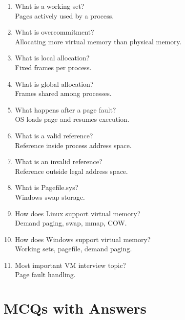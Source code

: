 \begin{enumerate}
\item What is a working set?\\
Pages actively used by a process.

\item What is overcommitment?\\
Allocating more virtual memory than physical memory.

\item What is local allocation?\\
Fixed frames per process.

\item What is global allocation?\\
Frames shared among processes.

\item What happens after a page fault?\\
OS loads page and resumes execution.

\item What is a valid reference?\\
Reference inside process address space.

\item What is an invalid reference?\\
Reference outside legal address space.

\item What is Pagefile.sys?\\
Windows swap storage.

\item How does Linux support virtual memory?\\
Demand paging, swap, mmap, COW.

\item How does Windows support virtual memory?\\
Working sets, pagefile, demand paging.

\item Most important VM interview topic?\\
Page fault handling.
\end{enumerate}

\section{MCQs with Answers}

